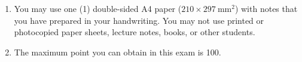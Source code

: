 \documentclass[addpoints]{exam}
\begin{document}
\begin{flushleft}
{{{\begin{enumerate}
	\begin{itemize}
		\item \texttt{1 \#!/bin/zsh}
		\item \texttt{2 \# 1/A 1234567890 Name Surname}
		\item \texttt{1 \#!/usr/bin/env python3}
		\item \texttt{2 \# 1/A 1234567890 Name Surname}
	\end{itemize}
    \item You may use one (1) double-sided A4 paper ($210\times297~{\mathrm{mm}^2}$) with notes that you have prepared in your handwriting. You may not use printed or photocopied paper sheets, lecture notes, books, or other students.
    \item The maximum point you can obtain in this exam is 100. 
\end{enumerate}}}}

\end{flushleft}
\begin{questions}






\end{questions}
\end{document}
